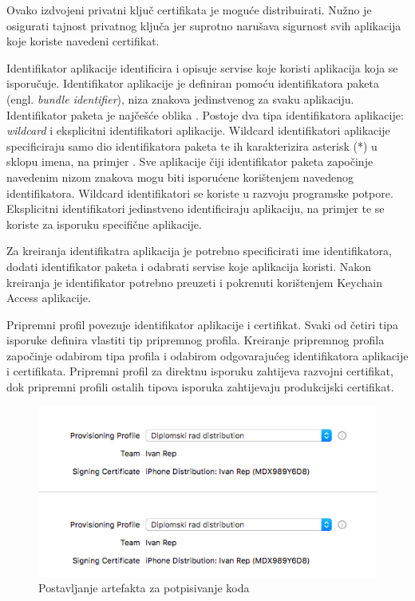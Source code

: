 \documentclass[times, utf8, diplomski, numeric]{fer}
\newcommand{\eng}[1]{(engl. \textit{#1})}
\begin{document}
Ovako izdvojeni privatni ključ certifikata je moguće distribuirati. Nužno je osigurati tajnost privatnog ključa jer suprotno narušava sigurnost svih aplikacija koje koriste navedeni certifikat.

Identifikator aplikacije identificira i opisuje servise koje koristi aplikacija koja se isporučuje. Identifikator aplikacije je definiran pomoću identifikatora paketa \eng{bundle identifier}, niza znakova jedinstvenog za svaku aplikaciju. Identifikator paketa je najčešće oblika . Postoje dva tipa identifikatora aplikacije: \textit{wildcard} i eksplicitni identifikatori aplikacije. Wildcard identifikatori aplikacije specificiraju samo dio identifikatora paketa te ih karakterizira asterisk (*) u sklopu imena, na primjer . Sve aplikacije čiji identifikator paketa započinje navedenim nizom znakova mogu biti isporućene korištenjem navedenog identifikatora. Wildcard identifikatori se koriste u razvoju programske potpore. Eksplicitni identifikatori jedinstveno identificiraju aplikaciju, na primjer  te se koriste za isporuku specifične aplikacije.

Za kreiranja identifikatra aplikacija je potrebno specificirati ime identifikatora, dodati identifikator paketa i odabrati servise koje aplikacija koristi. Nakon kreiranja je identifikator potrebno preuzeti i pokrenuti korištenjem Keychain Access aplikacije.

Pripremni profil povezuje identifikator aplikacije i certifikat. Svaki od četiri tipa isporuke definira vlastiti tip pripremnog profila. Kreiranje pripremnog profila započinje odabirom tipa profila i odabirom odgovarajućeg identifikatora aplikacije i certifikata. Pripremni profil za direktnu isporuku zahtijeva razvojni certifikat, dok pripremni profili ostalih tipova isporuka zahtijevaju produkcijski certifikat.

\begin{figure}
\centering
\includegraphics[scale=0.6]{SigningArtefactsSetup}
\caption{Postavljanje artefakta za potpisivanje koda}
\label{fig:SigningArtefactsSetup}
\end{figure}
\end{document}
